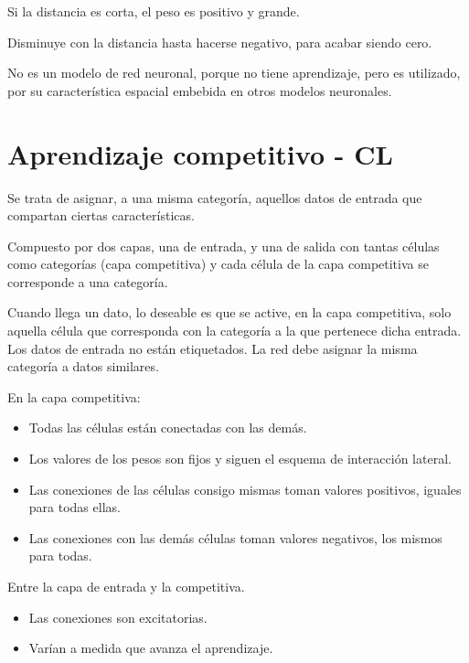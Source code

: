 \documentclass[12pt, twoside, openright]{report} %
\begin{document}
Si la distancia es corta, el peso es positivo y grande.

Disminuye con la distancia hasta hacerse negativo, para acabar siendo cero.

No es un modelo de red neuronal, porque no tiene aprendizaje, pero es utilizado, por su característica espacial embebida en otros modelos neuronales.

\section{Aprendizaje competitivo - CL}
Se trata de asignar, a una misma categoría, aquellos datos de entrada que compartan ciertas características.

Compuesto por dos capas, una de entrada, y una de salida con tantas células como categorías (capa competitiva) y cada célula de la capa competitiva se corresponde a una categoría.

Cuando llega un dato, lo deseable es que se active, en la capa competitiva, solo aquella célula que corresponda con la categoría a la que pertenece dicha entrada. Los datos de entrada no están etiquetados. La red debe asignar la misma categoría a datos similares.

En la capa competitiva:
\begin{itemize}
	\item Todas las células están conectadas con las demás.
	\item Los valores de los pesos son fijos y siguen el esquema de interacción lateral.
	\item Las conexiones de las células consigo mismas toman valores positivos, iguales para todas ellas.
	\item Las conexiones con las demás células toman valores negativos, los mismos para todas.
\end{itemize}

Entre la capa de entrada y la competitiva.
\begin{itemize}
	\item Las conexiones son excitatorias.
	\item Varían a medida que avanza el aprendizaje.
\end{itemize}
\end{document}
